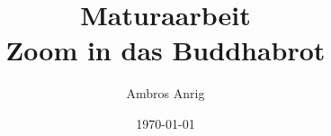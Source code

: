 

\title{Maturaarbeit \\ Zoom in das Buddhabrot}
\author{Ambros Anrig}
\date{\today}



\maketitle
\thispagestyle{empty}

\clearpage
\tableofcontents
\thispagestyle{empty}


















